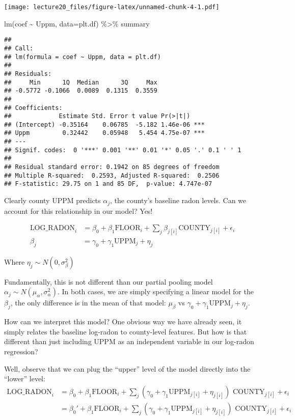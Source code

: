 \documentclass[
]{article}
\newenvironment{Shaded}{\begin{snugshade}}{\end{snugshade}}
\newcommand{\AttributeTok}[1]{\textcolor[rgb]{0.77,0.63,0.00}{#1}}
\newcommand{\FunctionTok}[1]{\textcolor[rgb]{0.00,0.00,0.00}{#1}}
\newcommand{\NormalTok}[1]{#1}
\newcommand{\SpecialCharTok}[1]{\textcolor[rgb]{0.00,0.00,0.00}{#1}}
\begin{document}
\texttt{[image: lecture20\_files/figure-latex/unnamed-chunk-4-1.pdf]}

\begin{Shaded}
\begin{Highlighting}[]
\FunctionTok{lm}\NormalTok{(coef }\SpecialCharTok{\textasciitilde{}}\NormalTok{ Uppm, }\AttributeTok{data=}\NormalTok{plt.df) }\SpecialCharTok{\%\textgreater{}\%}\NormalTok{ summary}
\end{Highlighting}
\end{Shaded}

\begin{verbatim}
## 
## Call:
## lm(formula = coef ~ Uppm, data = plt.df)
## 
## Residuals:
##     Min      1Q  Median      3Q     Max 
## -0.5772 -0.1066  0.0089  0.1315  0.3559 
## 
## Coefficients:
##             Estimate Std. Error t value Pr(>|t|)    
## (Intercept) -0.35164    0.06785  -5.182 1.46e-06 ***
## Uppm         0.32442    0.05948   5.454 4.75e-07 ***
## ---
## Signif. codes:  0 '***' 0.001 '**' 0.01 '*' 0.05 '.' 0.1 ' ' 1
## 
## Residual standard error: 0.1942 on 85 degrees of freedom
## Multiple R-squared:  0.2593, Adjusted R-squared:  0.2506 
## F-statistic: 29.75 on 1 and 85 DF,  p-value: 4.747e-07
\end{verbatim}

Clearly county UPPM predicts \(\alpha_j\), the county's baseline radon
levels. Can we account for this relationship in our model? Yes!

\[
\begin{split}
\text{LOG_RADON}_i &= \beta_0 + \beta_1 \text{FLOOR}_i + \sum_j \beta_{j[i]} \text{COUNTY}_{j[i]} + \epsilon_i\\
\beta_j &=  \gamma_0 + \gamma_1 \text{UPPM}_j + \eta_j
\end{split}
\]

Where \(\eta_j \sim N(0, \sigma^2_{\beta})\)

Fundamentally, this is not different than our partial pooling model
\(\alpha_j \sim N(\mu_{\alpha},\sigma^2_{\alpha})\). In both cases, we
are simply specifying a linear model for the \(\beta_j\), the only
difference is in the mean of that model: \(\mu_{\beta}\) vs
\(\gamma_0 + \gamma_1 \text{UPPM}_j + \eta_j\).

How can we interpret this model? One obvious way we have already seen,
it simply relates the baseline log-radon to county-level features. But
how is that different than just including UPPM as an independent
variable in our log-radon regression?

Well, observe that we can plug the ``upper'' level of the model directly
into the ``lower'' level: \[
\begin{split}
\text{LOG_RADON}_i &= \beta_0 + \beta_1 \text{FLOOR}_i + \sum_j (\gamma_0 + \gamma_1 \text{UPPM}_{j[i]} + \eta_{j[i]}) \text{ COUNTY}_{j[i]}  + \epsilon_i\\
&= \beta_0' + \beta_1 \text{FLOOR}_i + \sum_j (\gamma_0 + \gamma_1 \text{UPPM}_{j[i]} + \eta_{j[i]}) \text{ COUNTY}_{j[i]}  + \epsilon_i\\
\end{split}
\]
\end{document}
